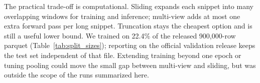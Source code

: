 \documentclass[10pt]{article}
\begin{document}
The practical trade-off is computational. Sliding expands each snippet into many overlapping windows for training and inference; multi-view adds at most one extra forward pass per long snippet. Truncation stays the cheapest option and is still a useful lower bound. We trained on 22.4\% of the released 900{,}000-row parquet (Table~\ref{tab:split_sizes}); reporting on the official validation release keeps the test set independent of that file. Extending training beyond one epoch or tuning pooling could move the small gap between multi-view and sliding, but was outside the scope of the runs summarized here.
\end{document}
